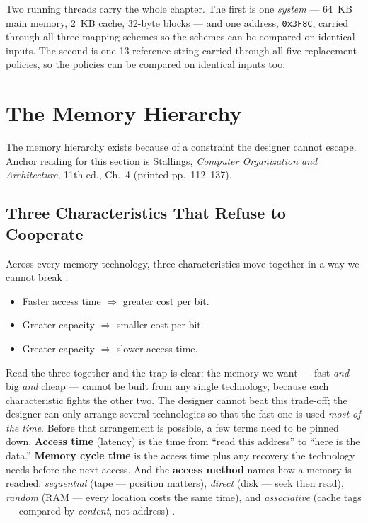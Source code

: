 \documentclass[11pt]{article}
\begin{document}
Two running threads carry the whole chapter. The first is one \emph{system} --- 64~KB main memory, 2~KB cache, 32-byte blocks --- and one address, \texttt{0x3F8C}, carried through all three mapping schemes so the schemes can be compared on identical inputs. The second is one 13-reference string carried through all five replacement policies, so the policies can be compared on identical inputs too.

\section{The Memory Hierarchy}
\label{sec:hierarchy}

The memory hierarchy exists because of a constraint the designer cannot escape. Anchor reading for this section is Stallings, \textit{Computer Organization and Architecture}, 11th ed., Ch.~4 (printed pp.~112--137).

\subsection{Three Characteristics That Refuse to Cooperate}

Across every memory technology, three characteristics move together in a way we cannot break \cite[Ch.~4, printed pp.~112--137]{Stallings2015_computer_organization}:

\begin{itemize}
  \item Faster access time $\Rightarrow$ greater cost per bit.
  \item Greater capacity $\Rightarrow$ smaller cost per bit.
  \item Greater capacity $\Rightarrow$ slower access time.
\end{itemize}

Read the three together and the trap is clear: the memory we want --- fast \emph{and} big \emph{and} cheap --- cannot be built from any single technology, because each characteristic fights the other two. The designer cannot beat this trade-off; the designer can only arrange several technologies so that the fast one is used \emph{most of the time}. Before that arrangement is possible, a few terms need to be pinned down. \textbf{Access time} (latency) is the time from ``read this address'' to ``here is the data.'' \textbf{Memory cycle time} is the access time plus any recovery the technology needs before the next access. And the \textbf{access method} names how a memory is reached: \emph{sequential} (tape --- position matters), \emph{direct} (disk --- seek then read), \emph{random} (RAM --- every location costs the same time), and \emph{associative} (cache tags --- compared by \emph{content}, not address) \cite[Table~4.1, PDF p.~156]{Stallings2015_computer_organization}.
\end{document}
